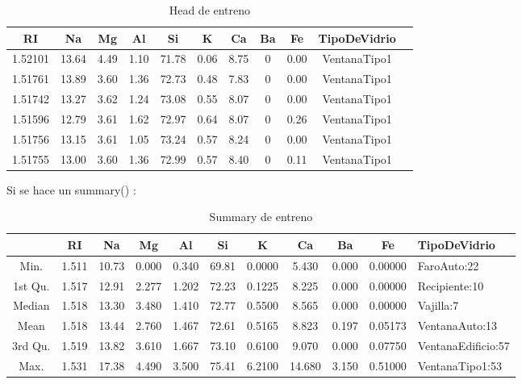 \begin{table}[H]
    \centering
    \begin{tabular}{ccccccccccl}
        \toprule
        RI & Na & Mg & Al & Si & K & Ca & Ba & Fe & TipoDeVidrio \\
        \midrule
        1.52101 & 13.64 & 4.49 & 1.10 & 71.78 & 0.06 & 8.75 & 0 & 0.00 & VentanaTipo1 \\
        1.51761 & 13.89 & 3.60 & 1.36 & 72.73 & 0.48 & 7.83 & 0 & 0.00 & VentanaTipo1 \\
        1.51742 & 13.27 & 3.62 & 1.24 & 73.08 & 0.55 & 8.07 & 0 & 0.00 & VentanaTipo1 \\
        1.51596 & 12.79 & 3.61 & 1.62 & 72.97 & 0.64 & 8.07 & 0 & 0.26 & VentanaTipo1 \\
        1.51756 & 13.15 & 3.61 & 1.05 & 73.24 & 0.57 & 8.24 & 0 & 0.00 & VentanaTipo1 \\
        1.51755 & 13.00 & 3.60 & 1.36 & 72.99 & 0.57 & 8.40 & 0 & 0.11 & VentanaTipo1 \\
        \bottomrule
    \end{tabular}
    \caption{Head de entreno}
    \label{tab:vidrio}
\end{table}
Si se hace un summary() :
\begin{table}[H]
  \centering
  \begin{tabular}{ccccccccccl}
    \toprule
    & RI & Na & Mg & Al & Si & K & Ca & Ba & Fe & TipoDeVidrio \\
    \midrule
    Min.    & 1.511 & 10.73 & 0.000 & 0.340 & 69.81 & 0.0000 & 5.430 & 0.000 & 0.00000 & FaroAuto:22 \\
    1st Qu. & 1.517 & 12.91 & 2.277 & 1.202 & 72.23 & 0.1225 & 8.225 & 0.000 & 0.00000 & Recipiente:10 \\
    Median  & 1.518 & 13.30 & 3.480 & 1.410 & 72.77 & 0.5500 & 8.565 & 0.000 & 0.00000 & Vajilla:7 \\
    Mean    & 1.518 & 13.44 & 2.760 & 1.467 & 72.61 & 0.5165 & 8.823 & 0.197 & 0.05173 & VentanaAuto:13 \\
    3rd Qu. & 1.519 & 13.82 & 3.610 & 1.667 & 73.10 & 0.6100 & 9.070 & 0.000 & 0.07750 & VentanaEdificio:57 \\
    Max.    & 1.531 & 17.38 & 4.490 & 3.500 & 75.41 & 6.2100 & 14.680 & 3.150 & 0.51000 & VentanaTipo1:53 \\
    \bottomrule
  \end{tabular}
  \caption{Summary de entreno}
  \label{tabla_descripcion}

\end{table}

